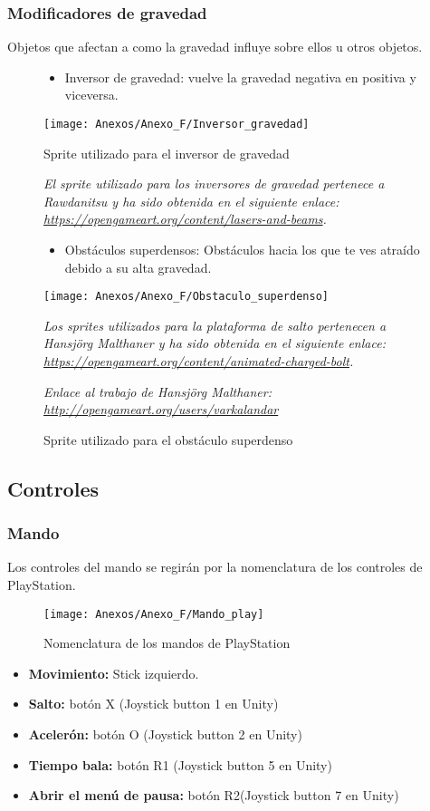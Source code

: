 \subsubsection{Modificadores de gravedad}
Objetos que afectan a como la gravedad influye sobre ellos u otros objetos.
\begin{figure}[h]
\begin{itemize}
\item
Inversor de gravedad: vuelve la gravedad negativa en positiva y viceversa.
\end{itemize}
\centering
\texttt{[image: Anexos/Anexo\_F/Inversor\_gravedad]}
\caption{Sprite utilizado para el inversor de gravedad}
\raggedright
\textit{El sprite utilizado para los inversores de gravedad pertenece a Rawdanitsu y ha sido obtenida en el siguiente enlace: \url{https://opengameart.org/content/lasers-and-beams}.}

\begin{itemize}
\item
Obstáculos superdensos: Obstáculos hacia los que te ves atraído debido a su alta gravedad.
\end{itemize}
\centering
\texttt{[image: Anexos/Anexo\_F/Obstaculo\_superdenso]}
\caption{Sprite utilizado para el obstáculo superdenso}
\raggedright
\textit{Los sprites utilizados para la plataforma de salto pertenecen a Hansjörg Malthaner y ha sido obtenida en el siguiente enlace: \url{https://opengameart.org/content/animated-charged-bolt}.}

\textit{Enlace al trabajo de Hansjörg Malthaner: \url{http://opengameart.org/users/varkalandar}}
\end{figure}

\clearpage
\subsection{Controles}
\subsubsection{Mando}
Los controles del mando se regirán por la nomenclatura de los controles de PlayStation.

\begin{figure}[h]
\centering
\texttt{[image: Anexos/Anexo\_F/Mando\_play]}
\caption{Nomenclatura de los mandos de PlayStation}
\end{figure}

\begin{itemize}
\item
\textbf{Movimiento:} Stick izquierdo.
\item
\textbf{Salto:} botón X (Joystick button 1 en Unity)
\item
\textbf{Acelerón:} botón O (Joystick button 2 en Unity)
\item
\textbf{Tiempo bala:} botón R1 (Joystick button 5 en Unity)
\item
\textbf{Abrir el menú de pausa:} botón R2(Joystick button 7 en Unity)
\end{itemize}

